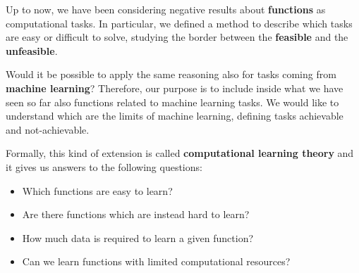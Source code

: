 Up to now, we have been considering negative results about \textbf{functions} as computational tasks. In particular, we defined a method to describe
which tasks are easy or difficult to solve, studying the border between the \textbf{feasible} and the \textbf{unfeasible}. \vspace{7pt}

Would it be possible to apply the same reasoning also for tasks coming from \textbf{machine learning}? Therefore, our purpose is to include inside what 
we have seen so far also functions related to machine learning tasks. We would like to understand which are the limits of machine learning, defining tasks 
achievable and not-achievable. \vspace{7pt}

Formally, this kind of extension is called \textbf{computational learning theory} and it gives us answers to the following questions:
\begin{itemize}
    \renewcommand{\labelitemi}{-}
    \item Which functions are easy to learn?
    \item Are there functions which are instead hard to learn?
    \item How much data is required to learn a given function?
    \item Can we learn functions with limited computational resources?
\end{itemize}